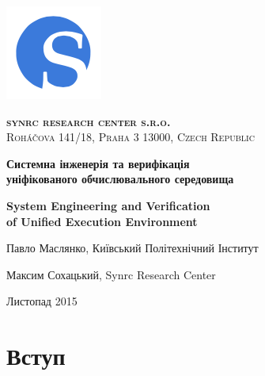 \documentclass[11pt,oneside]{article}
\begin{document}
\thispagestyle{empty}
\begin{center}

\begin{minipage}[t]{2cm}
    \includegraphics[scale=0.4]{img/S}
\end{minipage}
\begin{minipage}[t]{12cm}
    \begin{flushright}
        \textsc{{\Large {\bf {\color{Blue}syn}{\color{OrangeRed}rc} research center s.r.o.}}}\\
        \textsc{Roháčova 141/18, Praha 3 13000, Czech Republic}\\
    \end{flushright}
\end{minipage}

\vspace{3cm}

    \vspace{3cm}   {\Large \bf Системна інженерія та верифікація\\ \vspace{0.2cm} уніфікованого обчислювального середовища}\par
    \vspace{1cm}   {\Large \bf System Engineering and Verification\\ \vspace{0.2cm} of Unified Execution Environment}\par
    \vspace{3cm}   {\Large Павло Маслянко, Київський Політехнічний Інститут\par}
    \vspace{0.3cm} {\Large Максим Сохацький, Synrc Research Center\par}
    \vspace{4cm}   {\Large Листопад 2015}

\end{center}

\newpage
\vspace{2cm}
\tableofcontents
\newpage
\section{Вступ}
\end{document}
